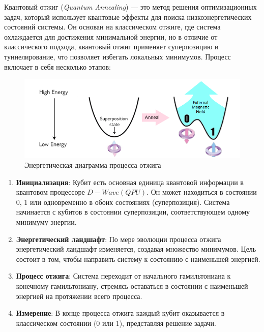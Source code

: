\documentclass[12pt]{article}
\begin{document}
Квантовый отжиг (\textit{Quantum Annealing}) — это метод решения оптимизационных задач, который использует квантовые эффекты для поиска низкоэнергетических состояний системы. Он основан на классическом отжиге, где система охлаждается для достижения минимальной энергии, но в отличие от классического подхода, квантовый отжиг применяет суперпозицию и туннелирование, что позволяет избегать локальных минимумов. Процесс включает в себя несколько этапов:

\begin{figure}[h]
    \centering
    \includegraphics[width=\textwidth]{res/evolution.png}
    \caption{Энергетическая диаграмма процесса отжига}
    \label{fig:compl}
\end{figure}

\begin{enumerate}
    \item \textbf{Инициализация}: Кубит есть основная единица квантовой информации в квантовом процессоре $D-Wave (QPU)$. Он может находиться в состоянии 0, 1 или одновременно в обоих состояниях (суперпозиция). Система начинается с кубитов в состоянии суперпозиции, соответствующем одному минимуму энергии.
    
    \item \textbf{Энергетический ландшафт}: По мере эволюции процесса отжига энергетический ландшафт изменяется, создавая множество минимумов. Цель состоит в том, чтобы направить систему к состоянию с наименьшей энергией.
    
    \item \textbf{Процесс отжига}: Система переходит от начального гамильтониана к конечному гамильтониану, стремясь оставаться в состоянии с наименьшей энергией на протяжении всего процесса.
    
    \item \textbf{Измерение}: В конце процесса отжига каждый кубит оказывается в классическом состоянии (0 или 1), представляя решение задачи.
\end{enumerate}
\end{document}
